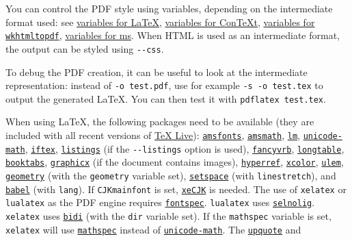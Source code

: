 \documentclass[
]{article}
\begin{document}
You can control the PDF style using variables, depending on the
intermediate format used: see \hyperref[variables-for-latex]{variables
for LaTeX}, \hyperref[variables-for-context]{variables for ConTeXt},
\hyperref[variables-for-wkhtmltopdf]{variables for
\texttt{wkhtmltopdf}}, \hyperref[variables-for-ms]{variables for ms}.
When HTML is used as an intermediate format, the output can be styled
using \texttt{-\/-css}.

To debug the PDF creation, it can be useful to look at the intermediate
representation: instead of \texttt{-o\ test.pdf}, use for example
\texttt{-s\ -o\ test.tex} to output the generated LaTeX. You can then
test it with \texttt{pdflatex\ test.tex}.

When using LaTeX, the following packages need to be available (they are
included with all recent versions of
\href{https://www.tug.org/texlive/}{TeX Live}):
\href{https://ctan.org/pkg/amsfonts}{\texttt{amsfonts}},
\href{https://ctan.org/pkg/amsmath}{\texttt{amsmath}},
\href{https://ctan.org/pkg/lm}{\texttt{lm}},
\href{https://ctan.org/pkg/unicode-math}{\texttt{unicode-math}},
\href{https://ctan.org/pkg/iftex}{\texttt{iftex}},
\href{https://ctan.org/pkg/listings}{\texttt{listings}} (if the
\texttt{-\/-listings} option is used),
\href{https://ctan.org/pkg/fancyvrb}{\texttt{fancyvrb}},
\href{https://ctan.org/pkg/longtable}{\texttt{longtable}},
\href{https://ctan.org/pkg/booktabs}{\texttt{booktabs}},
\href{https://ctan.org/pkg/graphicx}{\texttt{graphicx}} (if the document
contains images),
\href{https://ctan.org/pkg/hyperref}{\texttt{hyperref}},
\href{https://ctan.org/pkg/xcolor}{\texttt{xcolor}},
\href{https://ctan.org/pkg/ulem}{\texttt{ulem}},
\href{https://ctan.org/pkg/geometry}{\texttt{geometry}} (with the
\texttt{geometry} variable set),
\href{https://ctan.org/pkg/setspace}{\texttt{setspace}} (with
\texttt{linestretch}), and
\href{https://ctan.org/pkg/babel}{\texttt{babel}} (with \texttt{lang}).
If \texttt{CJKmainfont} is set,
\href{https://ctan.org/pkg/xecjk}{\texttt{xeCJK}} is needed. The use of
\texttt{xelatex} or \texttt{lualatex} as the PDF engine requires
\href{https://ctan.org/pkg/fontspec}{\texttt{fontspec}}.
\texttt{lualatex} uses
\href{https://ctan.org/pkg/selnolig}{\texttt{selnolig}}.
\texttt{xelatex} uses \href{https://ctan.org/pkg/bidi}{\texttt{bidi}}
(with the \texttt{dir} variable set). If the \texttt{mathspec} variable
is set, \texttt{xelatex} will use
\href{https://ctan.org/pkg/mathspec}{\texttt{mathspec}} instead of
\href{https://ctan.org/pkg/unicode-math}{\texttt{unicode-math}}. The
\href{https://ctan.org/pkg/upquote}{\texttt{upquote}} and
\end{document}
